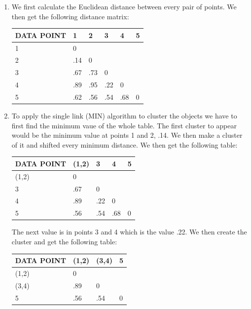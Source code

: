 \documentclass{article}
\begin{document}
\begin{enumerate}
    \item We first calculate the Euclidean distance between every pair of points. We then get the following distance matrix:
    
    \begin{table}[h]
        \begin{tabular}{|l|l|l|l|l|l|}
        \hline
        DATA POINT & 1   & 2   & 3   & 4   & 5 \\ \hline
        1          & 0   &     &     &     &   \\ \hline
        2          & .14 & 0   &     &     &   \\ \hline
        3          & .67 & .73 & 0   &     &   \\ \hline
        4          & .89 & .95 & .22 & 0   &   \\ \hline
        5          & .62 & .56 & .54 & .68 & 0 \\ \hline
        \end{tabular}
        \centering
    \end{table}

    \item To apply the single link (MIN) algorithm to cluster the objects we have to first find the minimum vaue of the whole table. The first cluster to appear would be the minimum value at points 1 and 2, .14. We then make a cluster of it and shifted every minimum distance. We then get the following table:
    \begin{table}[h]
        \begin{tabular}{|l|l|l|l|l|}
        \hline
        DATA POINT & (1,2) & 3   & 4   & 5 \\ \hline
        (1,2)      & 0     &     &     &   \\ \hline
        3          & .67   & 0   &     &   \\ \hline
        4          & .89   & .22 & 0   &   \\ \hline
        5          & .56   & .54 & .68 & 0 \\ \hline
        \end{tabular}
        \centering
    \end{table}
    The next value is in points 3 and 4 which is the value .22. We then create the cluster and get the following table:

    \begin{table}[h]
        \begin{tabular}{|l|l|l|l|}
        \hline
        DATA POINT & (1,2) & (3,4) & 5         \\ \hline
        (1,2)      & 0     &       & \textbf{} \\ \hline
        (3,4)      & .89   & 0     & \textbf{} \\ \hline
        5          & .56   & .54   & 0         \\ \hline
        \end{tabular}
        \centering
    \end{table}
    

\end{enumerate}
\end{document}
